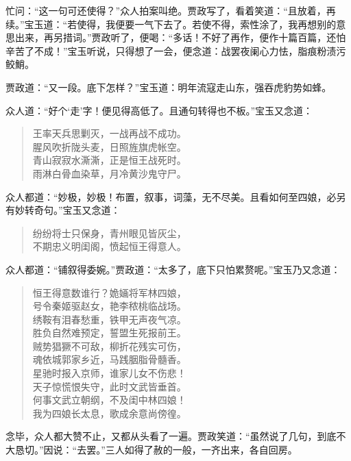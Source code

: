 \documentclass[12pt,oneside]{book}
\newenvironment{shici}{%
\begin{verse}%
\centering\large\hspace{12pt}}%
{\end{verse}}
\begin{document}
忙问：“这一句可还使得？”众人拍案叫绝。贾政写了，看着笑道：“且放着，再续。”宝玉道：“若使得，我便要一气下去了。若使不得，索性涂了，我再想别的意思出来，再另措词。”贾政听了，便喝：“多话！不好了再作，便作十篇百篇，还怕辛苦了不成！”宝玉听说，只得想了一会，便念道：战罢夜阑心力怯，脂痕粉渍污鲛鮹。

贾政道：“又一段。底下怎样？”宝玉道：明年流寇走山东，强吞虎豹势如蜂。

众人道：“好个‘走’字！便见得高低了。且通句转得也不板。”宝玉又念道：

\begin{shici}
王率天兵思剿灭，一战再战不成功。\\
腥风吹折陇头麦，日照旌旗虎帐空。\\
青山寂寂水澌澌，正是恒王战死时。\\
雨淋白骨血染草，月冷黄沙鬼守尸。
\end{shici}


众人都道：“妙极，妙极！布置，叙事，词藻，无不尽美。且看如何至四娘，必另有妙转奇句。”宝玉又念道：

\begin{shici}
纷纷将士只保身，青州眼见皆灰尘，\\
不期忠义明闺阁，愤起恒王得意人。
\end{shici}


众人都道：“铺叙得委婉。”贾政道：“太多了，底下只怕累赘呢。”宝玉乃又念道：

\begin{shici}
恒王得意数谁行？姽婳将军林四娘，\\
号令秦姬驱赵女，艳李秾桃临战场。\\
绣鞍有泪春愁重，铁甲无声夜气凉。\\
胜负自然难预定，誓盟生死报前王。\\
贼势猖獗不可敌，柳折花残实可伤，\\
魂依城郭家乡近，马践胭脂骨髓香。\\
星驰时报入京师，谁家儿女不伤悲！\\
天子惊慌恨失守，此时文武皆垂首。\\
何事文武立朝纲，不及闺中林四娘！\\
我为四娘长太息，歌成余意尚傍徨。
\end{shici}


念毕，众人都大赞不止，又都从头看了一遍。贾政笑道：“虽然说了几句，到底不大恳切。”因说：“去罢。”三人如得了赦的一般，一齐出来，各自回房。
\end{document}
